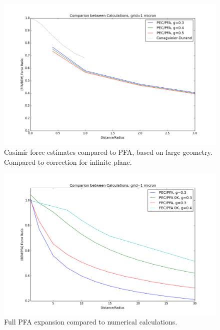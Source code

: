 \documentclass[11pt,traditabstract]{article}
\begin{document}
\begin{figure}[h]
\centering
\includegraphics[width=5in]{pfa_v_pec_best}
\caption{Casimir force estimates compared to PFA, based on large geometry. Compared to correction for infinite plane.}\label{fig:geometricbest}
\end{figure}

\begin{figure}[!h]
\centering
\includegraphics[width=5in]{geometry_corrections}
\caption{Full PFA expansion compared to numerical calculations.}\label{fig:geomCorr}
\end{figure}
\end{document}
